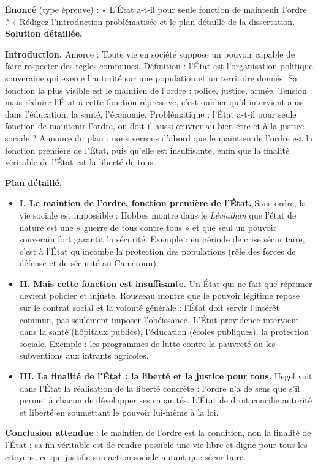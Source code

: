 \documentclass[11pt]{article}
\newcommand{\cle}[1]{{\popxbold\color{popdark}#1}}
\begin{document}
\begin{exoresolu}
\textbf{Énoncé} (type épreuve) : « L'État a-t-il pour seule fonction de maintenir l'ordre ? » Rédigez l'introduction problématisée et le plan détaillé de la dissertation.
\tcblower
\textbf{Solution détaillée.}

\textbf{Introduction.} Amorce : Toute vie en société suppose un pouvoir capable de faire respecter des règles communes. Définition : l'\cle{État} est l'organisation politique souveraine qui exerce l'autorité sur une population et un territoire donnés. Sa fonction la plus visible est le maintien de l'ordre : police, justice, armée. Tension : mais réduire l'État à cette fonction répressive, c'est oublier qu'il intervient aussi dans l'éducation, la santé, l'économie. Problématique : l'État a-t-il pour seule fonction de maintenir l'ordre, ou doit-il aussi œuvrer au bien-être et à la justice sociale ? Annonce du plan : nous verrons d'abord que le maintien de l'ordre est la fonction première de l'État, puis qu'elle est insuffisante, enfin que la finalité véritable de l'État est la liberté de tous.

\textbf{Plan détaillé.}
\begin{itemize}
\item \textbf{I. Le maintien de l'ordre, fonction première de l'État.} Sans ordre, la vie sociale est impossible : Hobbes montre dans le \emph{Léviathan} que l'état de nature est une « guerre de tous contre tous » et que seul un pouvoir souverain fort garantit la sécurité. Exemple : en période de crise sécuritaire, c'est à l'État qu'incombe la protection des populations (rôle des forces de défense et de sécurité au Cameroun).
\item \textbf{II. Mais cette fonction est insuffisante.} Un État qui ne fait que réprimer devient policier et injuste. Rousseau montre que le pouvoir légitime repose sur le contrat social et la volonté générale : l'État doit servir l'intérêt commun, pas seulement imposer l'obéissance. L'\cle{État-providence} intervient dans la santé (hôpitaux publics), l'éducation (écoles publiques), la protection sociale. Exemple : les programmes de lutte contre la pauvreté ou les subventions aux intrants agricoles.
\item \textbf{III. La finalité de l'État : la liberté et la justice pour tous.} Hegel voit dans l'État la réalisation de la liberté concrète : l'ordre n'a de sens que s'il permet à chacun de développer ses capacités. L'État de droit concilie autorité et liberté en soumettant le pouvoir lui-même à la loi.
\end{itemize}

\textbf{Conclusion attendue} : le maintien de l'ordre est la condition, non la finalité de l'État ; sa fin véritable est de rendre possible une vie libre et digne pour tous les citoyens, ce qui justifie son action sociale autant que sécuritaire.
\end{exoresolu}
\end{document}
